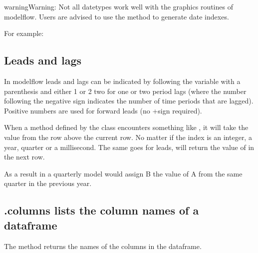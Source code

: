 \documentclass[letterpaper,10pt,english]{jupyterBook}
\begin{document}
\begin{sphinxadmonition}{warning}{Warning:}
\sphinxAtStartPar
Not all datetypes work well with the graphics routines of modelflow.  Users are advised to use the  method to generate date indexes.

\sphinxAtStartPar
For example:

\begin{sphinxVerbatim}[commandchars=\\\{\}]
      
\end{sphinxVerbatim}
\end{sphinxadmonition}


\subsection{Leads and lags}
\label{\detokenize{content/04_PythonEssentials/PythonPandasDataframes:leads-and-lags}}
\sphinxAtStartPar
In modelflow leads and lags can be indicated by following the variable with a parenthesis and either \sphinxhyphen{}1 or \sphinxhyphen{}2 two for one or two period lags (where the number following the negative sign indicates the number of time periods that are lagged). Positive numbers are used for forward leads (no +sign required).

\sphinxAtStartPar
When a method defined by the  class encounters something like , it will take the value from the row above the current row. No matter if the index is an integer, a year, quarter or a millisecond. The same goes for leads,  will return the value of  in the next row.

\sphinxAtStartPar
As a result in a quarterly model  would assign B the value of A from the same quarter in the previous year.


\subsection{.columns lists the column names of a dataframe}
\label{\detokenize{content/04_PythonEssentials/PythonPandasDataframes:columns-lists-the-column-names-of-a-dataframe}}
\sphinxAtStartPar
The method  returns the names of the columns in the dataframe.
\end{document}
